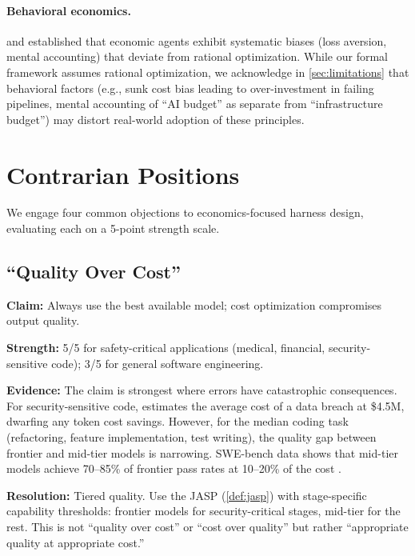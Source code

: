 \documentclass[11pt, a4paper, logo, copyright]{googledeepmind}
\begin{document}
\paragraph{Behavioral economics.}
\citet{kahneman1979} and \citet{thaler1999} established that economic agents exhibit systematic biases (loss aversion, mental accounting) that deviate from rational optimization. While our formal framework assumes rational optimization, we acknowledge in \cref{sec:limitations} that behavioral factors (e.g., sunk cost bias leading to over-investment in failing pipelines, mental accounting of ``AI budget'' as separate from ``infrastructure budget'') may distort real-world adoption of these principles.


\section{Contrarian Positions}\label{sec:contrarian}

We engage four common objections to economics-focused harness design, evaluating each on a 5-point strength scale.

\subsection{``Quality Over Cost''}

\textbf{Claim:} Always use the best available model; cost optimization compromises output quality.

\textbf{Strength:} 5/5 for safety-critical applications (medical, financial, security-sensitive code); 3/5 for general software engineering.

\textbf{Evidence:} The claim is strongest where errors have catastrophic consequences. For security-sensitive code, \citet{ibmponemon2025} estimates the average cost of a data breach at \$4.5M, dwarfing any token cost savings. However, for the median coding task (refactoring, feature implementation, test writing), the quality gap between frontier and mid-tier models is narrowing. SWE-bench data shows that mid-tier models achieve 70--85\% of frontier pass rates at 10--20\% of the cost \citep{jetbrains2025}.

\textbf{Resolution:} Tiered quality. Use the JASP (\cref{def:jasp}) with stage-specific capability thresholds: frontier models for security-critical stages, mid-tier for the rest. This is not ``quality over cost'' or ``cost over quality'' but rather ``appropriate quality at appropriate cost.''
\end{document}
